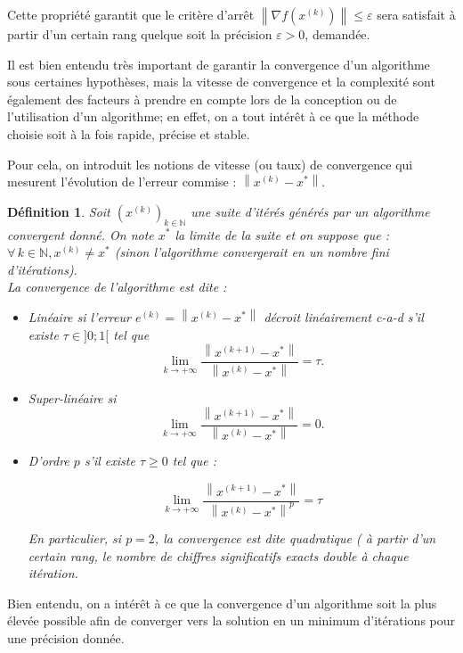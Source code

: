 \documentclass[12pt,a4paper,openay]{book}
\newtheorem{Def}{D\'efinition}[chapter]
\numberwithin{equation}{chapter}
\newcommand{\N}{\mathbb{N}}
\newcommand{\xk}{x^{(k)}}
\let\oldforall\forall
\renewcommand{\forall}{\oldforall\,}
\begin{document}
	Cette propri\'et\'e garantit que le crit\`ere d'arr\^et $\left\|\nabla f\left(x^{(k)}\right)\right\| \leq \varepsilon$ sera satisfait \`a partir d'un certain rang quelque soit la pr\'ecision $\varepsilon >0$, demand\'ee.
	
	Il est bien entendu tr\`es important de garantir la convergence d'un algorithme sous certaines hypoth\`eses, mais la vitesse de convergence et la complexit\'e sont \'egalement des facteurs \`a prendre en compte lors de la conception ou de l'utilisation d'un algorithme; en effet, on a tout int\'er\^et \`a ce que la m\'ethode choisie soit \`a la fois rapide, pr\'ecise et stable.
	
	Pour cela, on introduit les notions de vitesse (ou taux) de convergence qui mesurent l'\'evolution de l'erreur commise : $\left\|\xk -x^{*}\right\|$.
	
	\begin{Def}
		Soit $\left(x^{(k)}\right)_{k \in \N}$ une suite d'it\'er\'es g\'en\'er\'es par un algorithme convergent donn\'e. On note $x^{*}$ la limite de la suite et on suppose que : $\forall k \in \N, \xk \neq x^{*}$ (sinon l'algorithme convergerait en un nombre fini d'it\'erations).\\	
		La convergence de l'algorithme est dite :
		
		\begin{itemize}
			\item[$\bullet$] Lin\'eaire si l'erreur $e^{(k)}=\left\|x^{(k)}-x^{*}\right\|$ d\'ecroit lin\'eairement c-a-d s'il existe $\tau \in] 0 ; 1[$ tel que	
			$$
			\lim\limits_{k \to+\infty} \frac{\left\|x^{(k+1)}-x^{*}\right\|}{\left\|x^{(k)}-x^{*}\right\|}=\tau.
			$$	
			\item[$\bullet$] Super-lin\'eaire si
			$$ 
			\lim\limits_{k \to+\infty} \frac{\left\|x^{(k+1)}-x^{*}\right\|}{\left\|x^{(k)}-x^{*}\right\|}=0.$$		
			\item[$\bullet$] D'ordre $p$ s'il existe $\tau \geq 0$ tel que :
			
			$$
			\lim\limits_{k \to+\infty} \frac{\left\|x^{(k+1)}-x^{*}\right\|}{\left\|x^{(k)}-x^{*}\right\|^{p}}=\tau
			$$
			
			En particulier, si $p=2$, la convergence est dite quadratique ( \`a partir d'un certain rang, le nombre de chiffres significatifs exacts double \`a chaque it\'eration.
		\end{itemize}
	\end{Def}
	
	Bien entendu, on a int\'er\^et \`a ce que la convergence d'un algorithme soit la plus \'elev\'ee possible afin de converger vers la solution en un minimum d'it\'erations pour une pr\'ecision donn\'ee.
	
\end{document}
